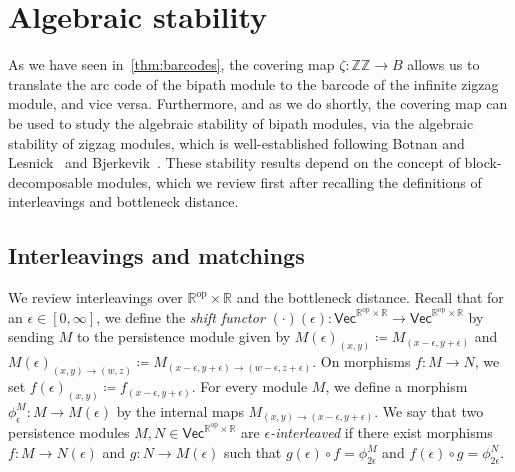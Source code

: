 \documentclass[a4paper,english,reqno]{amsart}
\newcommand{\deff}{\textit}
\newcommand\op{^{\mathrm{op}}}
\newcommand\ZZ{\mathbb{ZZ}}
\newcommand\bbR{\mathbb{R}}
\newcommand\RR{\bbR\op\times \bbR}
\newcommand{\cat}[1]{\ensuremath{\mathsf{#1}}}
\renewcommand{\Vec}{\cat{Vec}}
\theoremstyle{plain}
\theoremstyle{definition} %
\begin{document}
\section{Algebraic stability}\label{sec:stability}
As we have seen in~\cref{thm:barcodes}, the covering map $\zeta\colon\ZZ\to B$ allows us to translate the arc code of the bipath module to the barcode of the infinite zigzag module, and vice versa. Furthermore, and as we do shortly, the covering map can be used to study the algebraic stability of bipath modules, via the algebraic stability of zigzag modules, which is well-established following Botnan and Lesnick~\cite{botnanAlgebraicStabilityZigzag2018} and Bjerkevik~\cite{bjerkevikStabilityIntervalDecomposable2021}. These stability results depend on the concept of block-decomposable modules, which we review first after recalling the definitions of interleavings and bottleneck distance.

\subsection{Interleavings and matchings} We review interleavings over $\RR$ and the bottleneck distance. Recall that for an $\epsilon\in [0, \infty]$, we define the \deff{shift functor} $(\cdot)(\epsilon)\colon \Vec^{\RR} \to \Vec^{\RR}$ by sending $M$ to the persistence module given by $M(\epsilon)_{(x, y)} \coloneqq M_{(x-\epsilon, y+\epsilon)}$ and $M(\epsilon)_{(x, y)\to (w, z)} \coloneqq M_{(x-\epsilon, y+\epsilon)\to (w-\epsilon, z+\epsilon)}$. On morphisms $f\colon M\to N$, we set $f(\epsilon)_{(x, y)}\coloneqq f_{(x-\epsilon, y+\epsilon)}$. For every module $M$, we define a morphism $\phi^M_\epsilon\colon M\to M(\epsilon)$ by the internal maps $M_{(x, y)\to (x-\epsilon, y+\epsilon)}$. We say that two persistence modules $M, N\in\Vec^{\RR}$ are \deff{$\epsilon$-interleaved} if there exist morphisms $f\colon M\to N(\epsilon)$ and $g\colon N\to M(\epsilon)$ such that $g(\epsilon)\circ f = \phi^M_{2\epsilon}$ and $f(\epsilon)\circ g = \phi^N_{2\epsilon}$.
\end{document}
